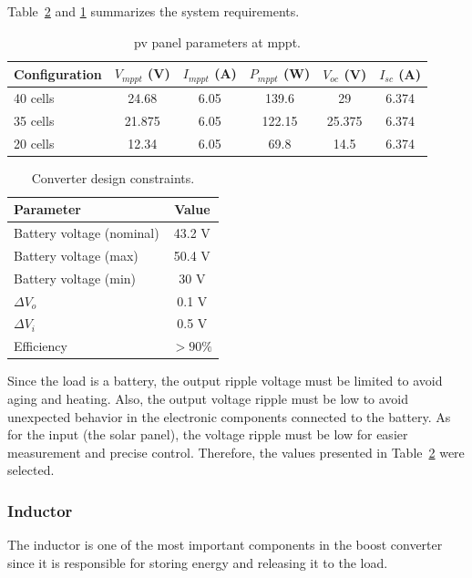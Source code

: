 Table~\ref{tab:converter_constraints} and \ref{tab:pv_conditions} summarizes the system requirements.



\begin{table}[!ht]
    \centering
    \caption{\acs{pv} panel parameters at \acs{mppt}.}
    \label{tab:pv_conditions}
    
    \begin{tabular}{lccccc}
        \hline
        Configuration & $V_{mppt}$ (V) & $I_{mppt}$ (A) & $P_{mppt}$ (W) & $V_{oc}$ (V) & $I_{sc}$ (A) \\
        \hline
        40 cells & 24.68 & 6.05 & 139.6 & 29 & 6.374 \\
        35 cells & 21.875 & 6.05 & 122.15 & 25.375 & 6.374 \\
        20 cells & 12.34 & 6.05 & 69.8 & 14.5 & 6.374 \\
        \hline
    \end{tabular}
\end{table}


\begin{table}[!ht]
    \centering
    \caption{Converter design constraints.}
    \label{tab:converter_constraints}
    
    \begin{tabular}{lc}
        \hline
        Parameter & Value \\
        \hline
        Battery voltage (nominal) & 43.2 V \\
        Battery voltage (max) & 50.4 V \\
        Battery voltage (min) & 30 V \\
        $\Delta V_o$ & 0.1 V \\
        $\Delta V_i$ & 0.5 V \\
        Efficiency & $> 90\%$ \\
        \hline
    \end{tabular}
\end{table}

Since the load is a battery, the output ripple voltage must be limited to avoid aging and heating. Also, the output voltage ripple must be low to avoid unexpected behavior in the electronic components connected to the battery. As for the input (the solar panel), the voltage ripple must be low for easier measurement and precise control. Therefore, the values presented in Table~\ref{tab:converter_constraints} were selected. 

\subsubsection{Inductor}
The inductor is one of the most important components in the boost converter since it is responsible for storing energy and releasing it to the load. 

